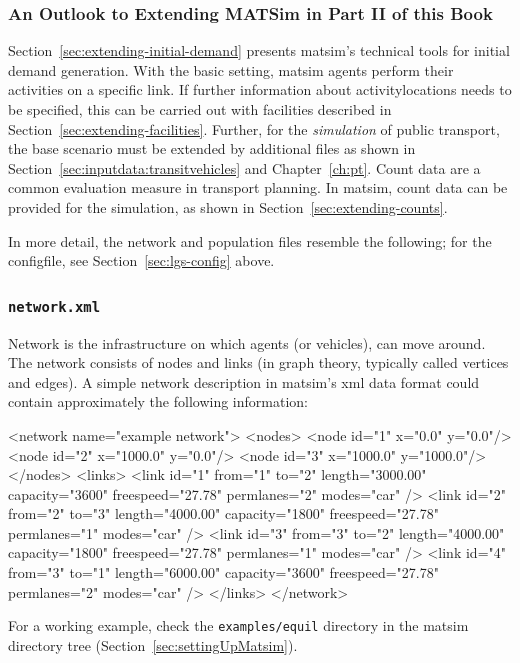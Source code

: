\subsubsection{An Outlook to Extending MATSim in Part II of this Book}
Section~\ref{sec:extending-initial-demand} presents \gls{matsim}'s technical tools for initial demand generation.
With the basic setting, \gls{matsim} agents perform their activities on a specific \gls{link}. If further information about \glspl{activitylocation} needs to be specified, this can be carried out with facilities described in Section~\ref{sec:extending-facilities}. Further, for the \emph{simulation} of public transport, the base scenario must be extended by additional files as shown in Section~\ref{sec:inputdata:transitvehicles} and Chapter~\ref{ch:pt}. Count data are a common evaluation measure in transport planning. In \gls{matsim}, count data can be provided for the simulation, as shown in Section~\ref{sec:extending-counts}. 
 
In more detail, the network and population files resemble the following; for the \gls{configfile}, see Section~\ref{sec:lgs-config} above.

\makeatletter
\newcommand\thefontsize{{The current font size is: \f@size pt\par}}
\makeatother

\subsubsection{\lstinline{network.xml}}
\label{sec:lgstarted-network-file}
 Network is the infrastructure on which agents (or vehicles), can move around. The network consists of \glspl{node} and \glspl{link} (in graph theory, typically called vertices and edges). A simple network description in \gls{matsim}'s \gls{xml} data format 
could contain approximately the following information:
\begin{xml}
<network name="example network"> 
   <nodes> 
      <node id="1" x="0.0" y="0.0"/> 
      <node id="2" x="1000.0" y="0.0"/> 
      <node id="3" x="1000.0" y="1000.0"/> 
   </nodes> 
   <links> 
      <link id="1" from="1" to="2" length="3000.00" capacity="3600" 
            freespeed="27.78" permlanes="2" modes="car" /> 
      <link id="2" from="2" to="3" length="4000.00" capacity="1800" 
            freespeed="27.78" permlanes="1" modes="car" /> 
      <link id="3" from="3" to="2" length="4000.00" capacity="1800" 
            freespeed="27.78" permlanes="1" modes="car" /> 
      <link id="4" from="3" to="1" length="6000.00" capacity="3600" 
            freespeed="27.78" permlanes="2" modes="car" /> 
   </links> 
</network>
\end{xml}
For a working example, check the \lstinline{examples/equil} directory in the \gls{matsim} directory tree (\cf Section~\ref{sec:settingUpMatsim}).

